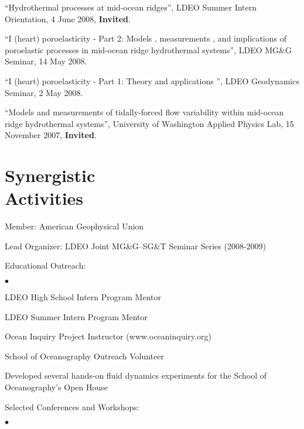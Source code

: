 \documentclass[11pt]{res}
\newenvironment{list2}{
  \begin{list}{$\bullet$}{%
      \setlength{\itemsep}{0in}
      \setlength{\parsep}{0in} \setlength{\parskip}{0in}
      \setlength{\topsep}{0in} \setlength{\partopsep}{0in} 
      \setlength{\leftmargin}{0.2in}}}{\end{list}}
\begin{document}
\begin{resume}
``Hydrothermal processes at mid-ocean ridges'', LDEO Summer Intern Orientation, 4 June 2008, {\bf Invited}.

``I (heart) poroelasticity - Part 2: Models , measurements , and implications of poroelastic processes in mid-ocean ridge hydrothermal systems'', LDEO MG\&G Seminar, 14 May 2008.

``I (heart) poroelasticity - Part 1: Theory and applications '', LDEO Geodynamics Seminar, 2 May 2008.

``Models and measurements of tidally-forced flow variability within mid-ocean ridge hydrothermal systems'', University of Washington Applied Physics Lab, 15 November 2007, {\bf Invited}.

\section{\sc Synergistic\\Activities}
Member: American Geophysical Union

Lead Organizer: LDEO Joint MG\&G--SG\&T Seminar Series (2008-2009)

Educational Outreach:
\begin{list2}
\item LDEO High School Intern Program Mentor
\item LDEO Summer Intern Program Mentor
\item Ocean Inquiry Project Instructor (www.oceaninquiry.org)
\item School of Oceanography Outreach Volunteer
\item Developed several hands-on fluid dynamics experiments for the School of Oceanography's Open House 
\end{list2}
Selected Conferences and Workshops: 
\begin{list2}


\end{list2}
\end{resume}
\end{document}
